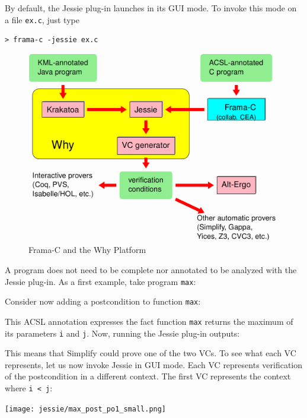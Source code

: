 \documentclass[a4paper,11pt,twoside,openright]{report}
\begin{document}
By default, the Jessie plug-in launches in its GUI mode. To invoke this
mode on a file \verb|ex.c|, just type

\begin{verbatim}
> frama-c -jessie ex.c
\end{verbatim}

\begin{figure}[t]
  \begin{center}
    \includegraphics[width=0.8\linewidth]{why_frama_c-mps3.png}
  \end{center}
  \caption{Frama-C and the Why Platform}
  \label{fig:platform}
\hrulefill
\end{figure}


A program does not need to be complete nor annotated to be analyzed
with the Jessie plug-in. As a first example, take program \verb|max|:



Consider now adding a postcondition to function \verb|max|:



This ACSL annotation expresses the fact function \verb|max| returns
the maximum of its parameters \verb|i| and \verb|j|. Now, running the
Jessie plug-in outputs:

This means that Simplify could prove one of the two VCs. To see
what each VC represents, let us now invoke Jessie in GUI
mode. Each VC represents verification of the postcondition in a
different context. The first VC represents the context where
\verb|i < j|:

\begin{center}
  \texttt{[image: jessie/max\_post\_po1\_small.png]}
\end{center}
\end{document}
